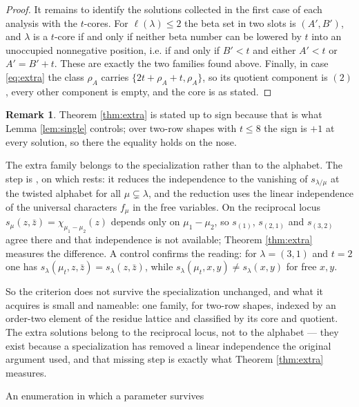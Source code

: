 \documentclass[11pt,reqno]{amsart}
\makeatletter
\renewcommand\section{\@startsection{section}{1}%
  \z@{\linespacing\@plus\linespacing}{.5\linespacing}%
  {\normalfont\large\bfseries\centering}}
\theoremstyle{plain}
\theoremstyle{definition}
\newtheorem{remark}[theorem]{Remark}
\newcommand{\zt}{\mu_t}
\newcommand{\zb}{\bar z}
\makeatother
\begin{document}
\begin{proof}
It remains to identify the solutions collected in the first case of each analysis with the
$t$-cores. For $\ell(\lambda)\le2$ the beta set in two slots is $(A',B')$, and $\lambda$ is a
$t$-core if and only if neither beta number can be lowered by $t$ into an unoccupied nonnegative
position, i.e. if and only if $B'<t$ and either $A'<t$ or $A'=B'+t$. These are exactly the two
families found above. Finally, in case \eqref{eq:extra} the class $\rho_A$ carries
$\{2t+\rho_A+t,\rho_A\}$, so its quotient component is $(2)$, every other component is empty, and
the core is as stated.
\end{proof}


\begin{remark}\label{rem:why}
Theorem \ref{thm:extra} is stated up to sign because that is what Lemma \ref{lem:single} controls;
over two-row shapes with $t\le8$ the sign is $+1$ at every solution, so there the equality holds on
the nose.

The extra family belongs to the specialization rather than to the alphabet. The step is
\cite[Lemma 5.2]{AK25}, on which \cite[Theorem 5.3]{AK25} rests: it reduces the independence to the
vanishing of $s_{\lambda/\mu}$ at the twisted alphabet for all $\mu\subsetneq\lambda$, and the
reduction uses the linear independence of the universal characters $f_\mu$ in the free variables. On the reciprocal locus $s_\mu(z,\zb)=\chi_{\mu_1-\mu_2}(z)$
depends only on $\mu_1-\mu_2$, so $s_{(1)}$, $s_{(2,1)}$ and $s_{(3,2)}$ agree there and that
independence is not available; Theorem \ref{thm:extra} measures the difference. A control confirms
the reading: for $\lambda=(3,1)$ and $t=2$ one has $s_\lambda(\zt,z,\zb)=s_\lambda(z,\zb)$, while
$s_\lambda(\zt,x,y)\ne s_\lambda(x,y)$ for free $x,y$.
\end{remark}

So the criterion does not survive the specialization unchanged, and what it acquires is small and
nameable: one family, for two-row shapes, indexed by an order-two element of the residue lattice and
classified by its core and quotient. The extra solutions belong to the reciprocal locus, not to the
alphabet --- they exist because a specialization has removed a linear independence the original
argument used, and that missing step is exactly what Theorem \ref{thm:extra} measures.

\section{An enumeration in which a parameter survives}\label{sec:enum}
\end{document}
